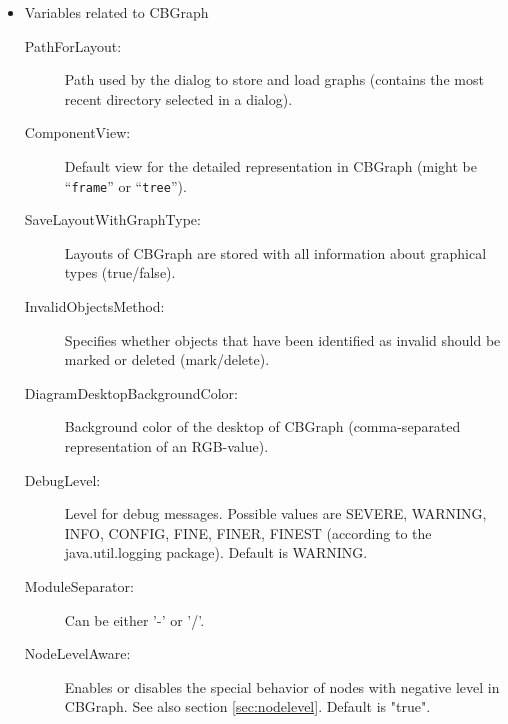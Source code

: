 \begin{itemize}
\item Variables related to CBGraph
\begin{description}
\item[PathForLayout:] Path used by the dialog to store and load graphs (contains the most recent directory selected in a dialog).
\item[ComponentView:] Default view for the detailed representation in CBGraph (might be ``\verb+frame+'' or ``\verb+tree+'').
\item[SaveLayoutWithGraphType:] Layouts of CBGraph are stored with all information about graphical types (true/false).
\item[InvalidObjectsMethod:] Specifies whether objects that have been identified as invalid should be marked or deleted (mark/delete).
\item[DiagramDesktopBackgroundColor:] Background color of the desktop of CBGraph (comma-separated representation of an RGB-value).
\item[DebugLevel:] Level for debug messages. Possible values are SEVERE, WARNING, INFO, CONFIG, FINE, FINER, FINEST
(according to the java.util.logging package). Default is WARNING.
\item[ModuleSeparator:] Can be either '-' or '/'. 
\item[NodeLevelAware:] Enables or disables the special behavior of nodes with negative level in CBGraph. See also
section \ref{sec:nodelevel}. Default is "true".
\end{description}
\end{itemize}


